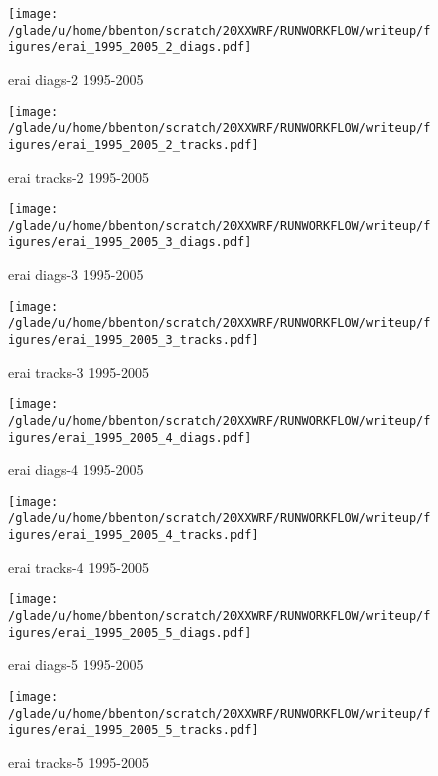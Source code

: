 \begin{figure}[!tbp]
\centering
\begin{minipage}[b]{0.45\textwidth}
\texttt{[image: /glade/u/home/bbenton/scratch/20XXWRF/RUNWORKFLOW/writeup/figures/erai\_1995\_2005\_2\_diags.pdf]}
\caption{erai diags-2 1995-2005}
\end{minipage}
\hfill
\begin{minipage}[b]{0.45\textwidth}
\texttt{[image: /glade/u/home/bbenton/scratch/20XXWRF/RUNWORKFLOW/writeup/figures/erai\_1995\_2005\_2\_tracks.pdf]}
\caption{erai tracks-2 1995-2005}
\end{minipage}
\end{figure}

\begin{figure}[!tbp]
\centering
\begin{minipage}[b]{0.45\textwidth}
\texttt{[image: /glade/u/home/bbenton/scratch/20XXWRF/RUNWORKFLOW/writeup/figures/erai\_1995\_2005\_3\_diags.pdf]}
\caption{erai diags-3 1995-2005}
\end{minipage}
\hfill
\begin{minipage}[b]{0.45\textwidth}
\texttt{[image: /glade/u/home/bbenton/scratch/20XXWRF/RUNWORKFLOW/writeup/figures/erai\_1995\_2005\_3\_tracks.pdf]}
\caption{erai tracks-3 1995-2005}
\end{minipage}
\end{figure}

\begin{figure}[!tbp]
\centering
\begin{minipage}[b]{0.45\textwidth}
\texttt{[image: /glade/u/home/bbenton/scratch/20XXWRF/RUNWORKFLOW/writeup/figures/erai\_1995\_2005\_4\_diags.pdf]}
\caption{erai diags-4 1995-2005}
\end{minipage}
\hfill
\begin{minipage}[b]{0.45\textwidth}
\texttt{[image: /glade/u/home/bbenton/scratch/20XXWRF/RUNWORKFLOW/writeup/figures/erai\_1995\_2005\_4\_tracks.pdf]}
\caption{erai tracks-4 1995-2005}
\end{minipage}
\end{figure}

\begin{figure}[!tbp]
\centering
\begin{minipage}[b]{0.45\textwidth}
\texttt{[image: /glade/u/home/bbenton/scratch/20XXWRF/RUNWORKFLOW/writeup/figures/erai\_1995\_2005\_5\_diags.pdf]}
\caption{erai diags-5 1995-2005}
\end{minipage}
\hfill
\begin{minipage}[b]{0.45\textwidth}
\texttt{[image: /glade/u/home/bbenton/scratch/20XXWRF/RUNWORKFLOW/writeup/figures/erai\_1995\_2005\_5\_tracks.pdf]}
\caption{erai tracks-5 1995-2005}
\end{minipage}
\end{figure}

